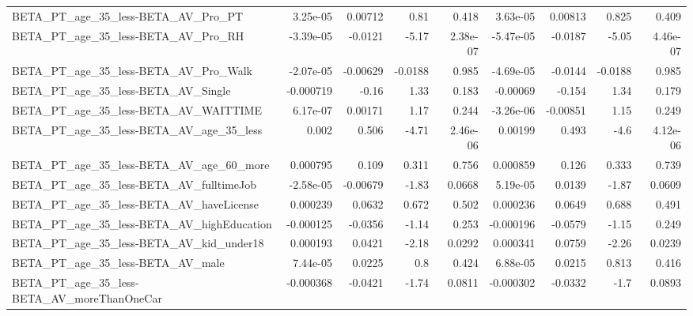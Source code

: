 \begin{tabular}{lrrrrrrrr}
BETA\_PT\_age\_35\_less-BETA\_AV\_Pro\_PT                 &    3.25e-05 &      0.00712 &      0.81 &    0.418 &   3.63e-05 &     0.00813 &        0.825 &         0.409 \\
BETA\_PT\_age\_35\_less-BETA\_AV\_Pro\_RH                 &   -3.39e-05 &      -0.0121 &     -5.17 & 2.38e-07 &  -5.47e-05 &     -0.0187 &        -5.05 &      4.46e-07 \\
BETA\_PT\_age\_35\_less-BETA\_AV\_Pro\_Walk               &   -2.07e-05 &     -0.00629 &   -0.0188 &    0.985 &  -4.69e-05 &     -0.0144 &      -0.0188 &         0.985 \\
BETA\_PT\_age\_35\_less-BETA\_AV\_Single                 &   -0.000719 &        -0.16 &      1.33 &    0.183 &   -0.00069 &      -0.154 &         1.34 &         0.179 \\
BETA\_PT\_age\_35\_less-BETA\_AV\_WAITTIME               &    6.17e-07 &      0.00171 &      1.17 &    0.244 &  -3.26e-06 &    -0.00851 &         1.15 &         0.249 \\
BETA\_PT\_age\_35\_less-BETA\_AV\_age\_35\_less            &       0.002 &        0.506 &     -4.71 & 2.46e-06 &    0.00199 &       0.493 &         -4.6 &      4.12e-06 \\
BETA\_PT\_age\_35\_less-BETA\_AV\_age\_60\_more            &    0.000795 &        0.109 &     0.311 &    0.756 &   0.000859 &       0.126 &        0.333 &         0.739 \\
BETA\_PT\_age\_35\_less-BETA\_AV\_fulltimeJob            &   -2.58e-05 &     -0.00679 &     -1.83 &   0.0668 &   5.19e-05 &      0.0139 &        -1.87 &        0.0609 \\
BETA\_PT\_age\_35\_less-BETA\_AV\_haveLicense            &    0.000239 &       0.0632 &     0.672 &    0.502 &   0.000236 &      0.0649 &        0.688 &         0.491 \\
BETA\_PT\_age\_35\_less-BETA\_AV\_highEducation          &   -0.000125 &      -0.0356 &     -1.14 &    0.253 &  -0.000196 &     -0.0579 &        -1.15 &         0.249 \\
BETA\_PT\_age\_35\_less-BETA\_AV\_kid\_under18            &    0.000193 &       0.0421 &     -2.18 &   0.0292 &   0.000341 &      0.0759 &        -2.26 &        0.0239 \\
BETA\_PT\_age\_35\_less-BETA\_AV\_male                   &    7.44e-05 &       0.0225 &       0.8 &    0.424 &   6.88e-05 &      0.0215 &        0.813 &         0.416 \\
BETA\_PT\_age\_35\_less-BETA\_AV\_moreThanOneCar         &   -0.000368 &      -0.0421 &     -1.74 &   0.0811 &  -0.000302 &     -0.0332 &         -1.7 &        0.0893 \\

\end{tabular}
